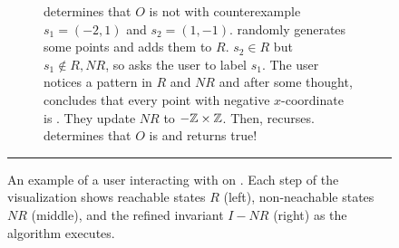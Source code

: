 \begin{figure*}[ht]
\begin{subfigure}[t]{0.58\textwidth}
\hspace{\tikzhspace}
    \hspace{\tikzhspace}
    \caption{%
      \Helper{} determines that $O$ is not  with
      counterexample $s_1 = (-2, 1)$ and $s_2 = (1, -1)$. \Helper{} randomly
      generates some \sTIreachable{} points and adds them to $R$. $s_2 \in R$
      but $s_1 \notin R, NR$, so \Helper{} asks the user to label $s_1$. The
      user notices a pattern in $R$ and $NR$ and after some thought, concludes
      that every point with negative $x$-coordinate is \sTIunreachable{}.
      They update $NR$ to $-\mathbb{Z} \times \mathbb{Z}$. Then, \Helper{} recurses.
      \Helper{} determines that $O$ is  and returns true!
    }
  \end{subfigure}

  \vspace{1em}
  \hrule
  \vspace{1em}

  \caption{%
    An example of a user interacting with
     on .  Each step
    of the visualization shows reachable states $R$ (left), non-neachable states $NR$ (middle), and the refined invariant $I - NR$ (right) as the
    algorithm executes.
  }
\end{figure*}
